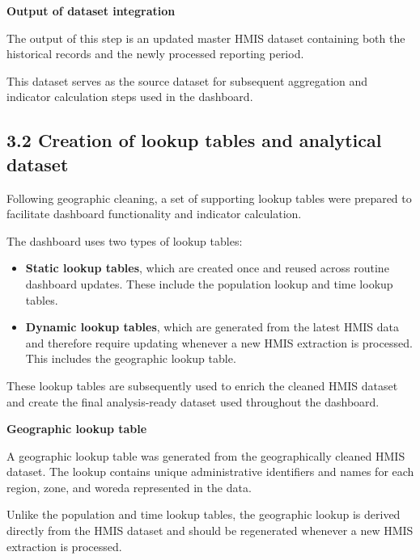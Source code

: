\documentclass[
  letterpaper,
  DIV=11,
  numbers=noendperiod]{scrartcl}
\begin{document}
\textbf{Output of dataset integration}

The output of this step is an updated master HMIS dataset containing
both the historical records and the newly processed reporting period.

This dataset serves as the source dataset for subsequent aggregation and
indicator calculation steps used in the dashboard.

\subsection{3.2 Creation of lookup tables and analytical
dataset}\label{creation-of-lookup-tables-and-analytical-dataset}

Following geographic cleaning, a set of supporting lookup tables were
prepared to facilitate dashboard functionality and indicator
calculation.

The dashboard uses two types of lookup tables:

\begin{itemize}
\item
  \textbf{Static lookup tables}, which are created once and reused
  across routine dashboard updates. These include the population lookup
  and time lookup tables.
\item
  \textbf{Dynamic lookup tables}, which are generated from the latest
  HMIS data and therefore require updating whenever a new HMIS
  extraction is processed. This includes the geographic lookup table.
\end{itemize}

These lookup tables are subsequently used to enrich the cleaned HMIS
dataset and create the final analysis-ready dataset used throughout the
dashboard.

\textbf{Geographic lookup table}

A geographic lookup table was generated from the geographically cleaned
HMIS dataset. The lookup contains unique administrative identifiers and
names for each region, zone, and woreda represented in the data.

Unlike the population and time lookup tables, the geographic lookup is
derived directly from the HMIS dataset and should be regenerated
whenever a new HMIS extraction is processed.
\end{document}
